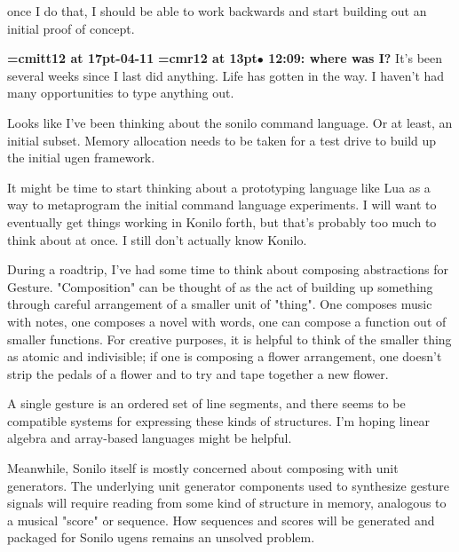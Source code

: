 once I do that, I should be able to work backwards and start building out an initial proof of concept.
\par

{\medskip\noindent\bf\font\titlefont=cmitt12 at 17pt-04-11}\medskip
{\smallskip\noindent\bf\font\titlefont=cmr12 at 13pt\titlefont $\bullet$ 12:09: where was I?}\smallskip
It's been several weeks since I last did anything. Life has gotten in the way. I haven't had many opportunities to type anything out.
\par

Looks like I've been thinking about the sonilo command language. Or at least, an initial subset. Memory allocation needs to be taken for a test drive to build up the initial ugen framework.
\par

It might be time to start thinking about a prototyping language like Lua as a way to metaprogram the initial command language experiments. I will want to eventually get things working in Konilo forth, but that's probably too much to think about at once. I still don't actually know Konilo.
\par

During a roadtrip, I've had some time to think about composing abstractions for Gesture. "Composition" can be thought of as the act of building up something through careful arrangement of a smaller unit of "thing". One composes music with notes, one composes a novel with words, one can compose a function out of smaller functions. For creative purposes, it is helpful to think of the smaller thing as atomic and indivisible; if one is composing a flower arrangement, one doesn't strip the pedals of a flower and to try and tape together a new flower.
\par

A single gesture is an ordered set of line segments, and there seems to be compatible systems for expressing these kinds of structures. I'm hoping linear algebra and array-based languages might be helpful.
\par

Meanwhile, Sonilo itself is mostly concerned about composing with unit generators. The underlying unit generator components used to synthesize gesture signals will require reading from some kind of structure in memory, analogous to a musical "score" or sequence. How sequences and scores will be generated and packaged for Sonilo ugens remains an unsolved problem.
\par

